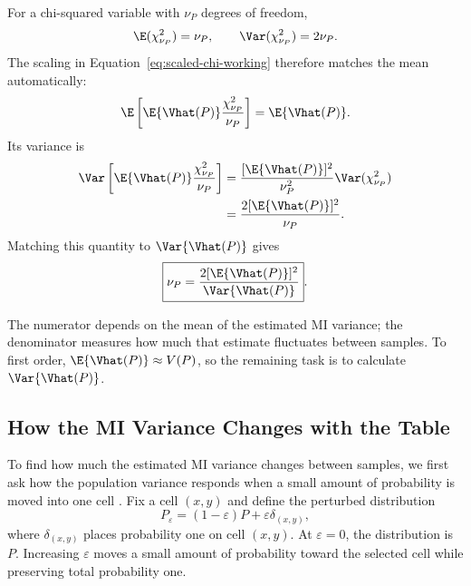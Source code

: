 For a chi-squared variable with \(\nu_P\) degrees of freedom,
\begin{equation}
  \E(\chi^2_{\nu_P})=\nu_P,
  \qquad
  \Var(\chi^2_{\nu_P})=2\nu_P.
\end{equation}
The scaling in Equation~\eqref{eq:scaled-chi-working} therefore matches the
mean automatically:
\begin{equation}
  \E\left[
  \E\{\Vhat(P)\}\frac{\chi^2_{\nu_P}}{\nu_P}
  \right]
  =\E\{\Vhat(P)\}.
\end{equation}
Its variance is
\begin{align}
  \Var\left[
  \E\{\Vhat(P)\}\frac{\chi^2_{\nu_P}}{\nu_P}
  \right]
  &=
  \frac{[\E\{\Vhat(P)\}]^2}{\nu_P^2}
  \Var(\chi^2_{\nu_P})\\
  &=
  \frac{2[\E\{\Vhat(P)\}]^2}{\nu_P}.
\end{align}
Matching this quantity to \(\Var\{\Vhat(P)\}\) gives
\begin{equation}
  \boxed{
  \nu_P
  =
  \frac{2[\E\{\Vhat(P)\}]^2}
       {\Var\{\Vhat(P)\}}
  }.
  \label{eq:component-df-moments}
\end{equation}
\begin{samepage}
The numerator depends on the mean of the estimated MI variance; the
denominator measures how much that estimate fluctuates between samples.
To first order, \(\E\{\Vhat(P)\}\approx V(P)\), so the remaining task is
to calculate \(\Var\{\Vhat(P)\}\).
\par
\end{samepage}

\begin{samepage}
\section{How the MI Variance Changes with the Table}

To find how much the estimated MI variance changes between samples, we first
ask how the population variance responds when a small amount of probability
is moved into one cell \citep{hampel1974,vanderVaart1998}. Fix a cell
\((x,y)\) and define the perturbed distribution
\begin{equation}
  P_\varepsilon
  =(1-\varepsilon)P+\varepsilon\delta_{(x,y)},
  \label{eq:contamination-path}
\end{equation}
where \(\delta_{(x,y)}\) places probability one on cell \((x,y)\). At
\(\varepsilon=0\), the distribution is \(P\). Increasing \(\varepsilon\)
moves a small amount of probability toward the selected cell while preserving
total probability one.
\par
\end{samepage}


